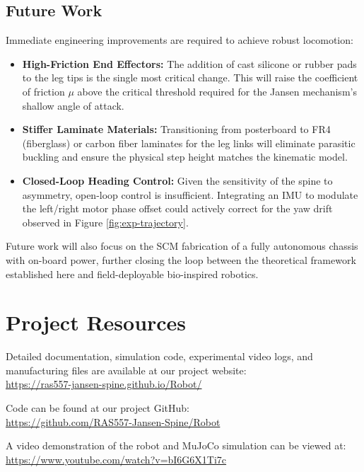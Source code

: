 \documentclass[11pt, a4paper]{article}
\begin{document}
\subsection{Future Work}
Immediate engineering improvements are required to achieve robust locomotion:
\begin{itemize}
    \item \textbf{High-Friction End Effectors:} The addition of cast silicone or rubber pads to the leg tips is the single most critical change. This will raise the coefficient of friction $\mu$ above the critical threshold required for the Jansen mechanism's shallow angle of attack.
    \item \textbf{Stiffer Laminate Materials:} Transitioning from posterboard to FR4 (fiberglass) or carbon fiber laminates for the leg links will eliminate parasitic buckling and ensure the physical step height matches the kinematic model.
    \item \textbf{Closed-Loop Heading Control:} Given the sensitivity of the spine to asymmetry, open-loop control is insufficient. Integrating an IMU to modulate the left/right motor phase offset could actively correct for the yaw drift observed in Figure \ref{fig:exp-trajectory}.
\end{itemize}

Future work will also focus on the SCM fabrication of a fully autonomous chassis with on-board power, further closing the loop between the theoretical framework established here and field-deployable bio-inspired robotics.

\section{Project Resources}
\label{sec:project_resources}

Detailed documentation, simulation code, experimental video logs, and manufacturing files are available at our project website: \\
\href{https://ras557-jansen-spine.github.io/Robot/}{https://ras557-jansen-spine.github.io/Robot/}

\vspace{0.5em}

\noindent Code can be found at our project GitHub:\\
\href{https://github.com/RAS557-Jansen-Spine/Robot}{https://github.com/RAS557-Jansen-Spine/Robot}

\vspace{0.5em}

\noindent A video demonstration of the robot and MuJoCo simulation can be viewed at:\\
\href{https://www.youtube.com/watch?v=bI6G6X1Ti7c}{https://www.youtube.com/watch?v=bI6G6X1Ti7c}
\end{document}
